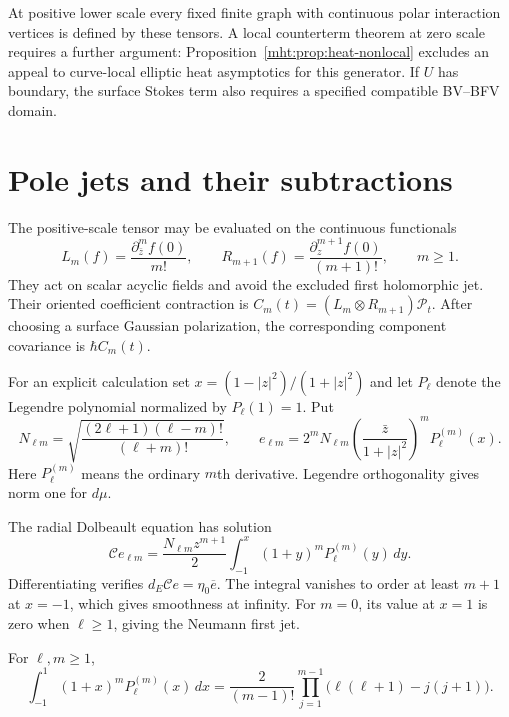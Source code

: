 At positive lower scale every fixed finite graph with continuous
polar interaction vertices is defined by these tensors. A local
counterterm theorem at zero scale requires a further argument:
Proposition~\ref{mht:prop:heat-nonlocal} excludes an appeal to
curve-local elliptic heat asymptotics for this generator.
If $U$ has boundary, the surface Stokes term also requires a
specified compatible BV--BFV domain.

\section{Pole jets and their subtractions}

The positive-scale tensor may be evaluated on the continuous
functionals
\[
 L_m(f)=\frac{\partial_{\bar z}^mf(0)}{m!},\qquad
 R_{m+1}(f)=\frac{\partial_z^{m+1}f(0)}{(m+1)!},\qquad m\geq1.
\]
They act on scalar acyclic fields and avoid the excluded first
holomorphic jet. Their oriented coefficient contraction is
$C_m(t)=(L_m\otimes R_{m+1})\mathcal P_t$.
After choosing a surface Gaussian polarization, the corresponding
component covariance is $\hbar C_m(t)$.

For an explicit calculation set
$x=(1-|z|^2)/(1+|z|^2)$ and let $P_\ell$ denote the Legendre
polynomial normalized by $P_\ell(1)=1$. Put
\[
 N_{\ell m}=\sqrt{\frac{(2\ell+1)(\ell-m)!}{(\ell+m)!}},
 \qquad
 e_{\ell m}=2^mN_{\ell m}
   \left(\frac{\bar z}{1+|z|^2}\right)^mP_\ell^{(m)}(x).
\]
Here $P_\ell^{(m)}$ means the ordinary $m$th derivative.
Legendre orthogonality gives norm one for $d\mu$.

The radial Dolbeault equation has solution
\begin{equation}\label{mht:eq:heat-radial-partner}
 \mathcal Ce_{\ell m}
   =\frac{N_{\ell m}z^{m+1}}2
       \int_{-1}^{x}(1+y)^mP_\ell^{(m)}(y)\,dy.
\end{equation}
Differentiating verifies $d_E\mathcal Ce=\eta_0\overline e$.
The integral vanishes to order at least $m+1$ at $x=-1$,
which gives smoothness at infinity. For $m=0$, its value at
$x=1$ is zero when $\ell\geq1$, giving the Neumann first jet.

\begin{lemma}\label{mht:lem:heat-legendre}
For $\ell,m\geq1$,
\begin{equation}\label{mht:eq:heat-legendre}
 \int_{-1}^{1}(1+x)^mP_\ell^{(m)}(x)\,dx
   =\frac2{(m-1)!}\prod_{j=1}^{m-1}
             \bigl(\ell(\ell+1)-j(j+1)\bigr).
\end{equation}
\end{lemma}

